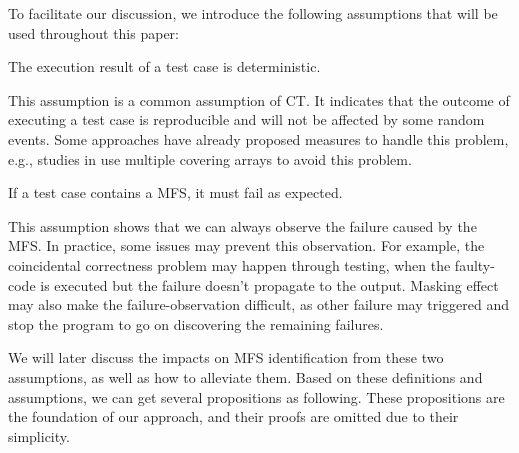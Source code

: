 %

To facilitate our discussion, we introduce the following assumptions that will be used throughout this paper:

\begin{assumption}  The execution result of a test case is deterministic.
\end{assumption}

This assumption is a common assumption of CT\cite{zhang2011characterizing,ghandehari2012identifying,niu2013identifying}. It indicates that the outcome of executing a test case is reproducible and will not be affected by some random events. Some approaches have already proposed measures to handle this problem, e.g., studies in \cite{yilmaz2006covering,fouche2009incremental} use multiple covering arrays to avoid this problem.

\begin{assumption} If a test case contains a MFS, it must fail as expected.
\end{assumption}

This assumption shows that we can always observe the failure caused by the MFS. In practice, some issues may prevent this observation. For example, the coincidental correctness problem \cite{Masri:2014:PCC:2582050.2559932} may happen through testing, when the faulty-code is executed but the failure doesn't propagate to the output. Masking effect \cite{yilmaz2013reducing} may also make the failure-observation difficult, as other failure may triggered and stop the program to go on discovering the remaining failures.

We will later discuss the impacts on MFS identification from these two assumptions, as well as how to alleviate them. Based on these definitions and assumptions, we can get several propositions as following. These propositions are the foundation of our approach, and their proofs are omitted due to their simplicity.

